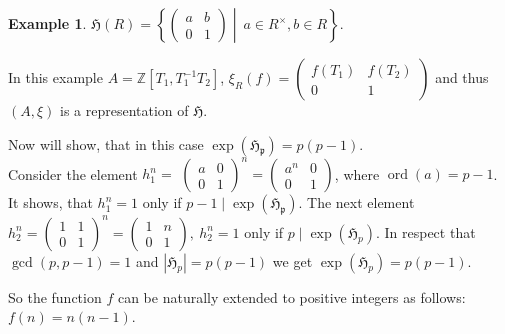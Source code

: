 \documentclass{article}
\theoremstyle{definition}
\newtheorem{example}{Example}
\theoremstyle{definition}
\begin{document}
\begin{example}
    $\mathfrak{H}(R) = \left\{ \left(\begin{matrix}
    a & b\\
    0 & 1
    \end{matrix}\right)\middle|\ a \in R^{\times}, b \in R\right\}$.

    In this example $A = \mathbb{Z}[T_1, T_1^{-1} T_2]$, $\xi_R(f) = \begin{pmatrix}
    f(T_1) & f(T_2)\\
    0 & 1
    \end{pmatrix}$ and thus $(A, \xi)$ is a representation of $\mathfrak{H}$.

Now will show, that in this case $\operatorname{exp}(\mathfrak{H_p}) = p(p - 1).$\\


Consider the element $h_1^n=$
$\left(\begin{matrix}
    a & 0\\
    0 & 1
    \end{matrix}\right)^{n} = \left(\begin{matrix}
    a^n & 0\\
    0 & 1
    \end{matrix}\right)$, where $\operatorname{ord}(a) = p-1$. It shows, that $h_1^n = 1$ only if $p-1 \mid \operatorname{exp}(\mathfrak{H_p})$.
    The next element $h_2^n = \left(\begin{matrix}
    1 & 1\\
    0 & 1
    \end{matrix}\right)^{n} = \left(\begin{matrix}
    1 & n\\
    0 & 1
    \end{matrix}\right),\ h_2^n = 1$ only if $p \mid \operatorname{exp}(\mathfrak{H}_p).$ In respect that $\operatorname{gcd}(p, p-1)=1$ and $\left|\mathfrak{H}_p\right| = p(p - 1)$ we get $\operatorname{exp}(\mathfrak{H}_p)=p(p-1).$

So the function $f$ can be naturally extended to positive integers as follows: $f(n) = n(n - 1)$.

\end{example}
\end{document}
